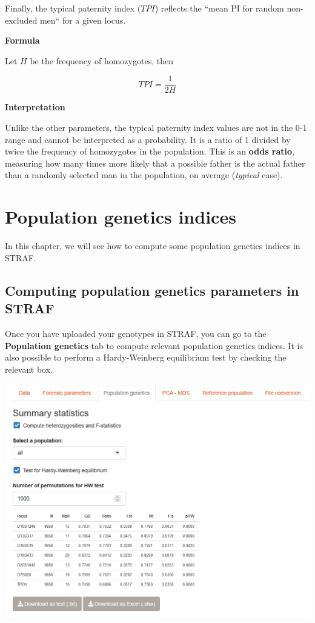 \documentclass[
]{book}
\begin{document}
Finally, the typical paternity index (\(TPI\)) reflects the ``mean PI for
random non-excluded men`` for a given locus.

\textbf{Formula}

Let \(H\) be the frequency of homozygotes, then

\[
TPI = \frac{1}{2H}
\]

\textbf{Interpretation}

Unlike the other parameters, the typical paternity index values are not in the 0-1
range and cannot be interpreted as a probability. It is a ratio of 1 divided by
twice the frequency of homozygotes in the population. This is an \textbf{odds ratio},
measuring how many times more likely that a possible father is the actual
father than a randomly selected man in the population, on average (\emph{typical} case).

\hypertarget{population-genetics-indices}{%
\chapter{Population genetics indices}\label{population-genetics-indices}}

In this chapter, we will see how to compute some population genetics indices in STRAF.

\hypertarget{computing-population-genetics-parameters-in-straf}{%
\section{Computing population genetics parameters in STRAF}\label{computing-population-genetics-parameters-in-straf}}

Once you have uploaded your genotypes in STRAF, you can go to the \textbf{Population genetics}
tab to compute relevant population genetics indices. It is also possible to perform
a Hardy-Weinberg equilibrium test by checking the relevant box.

\includegraphics[width=0.8\linewidth]{img/capture_popgen_parameters_1}
\end{document}
